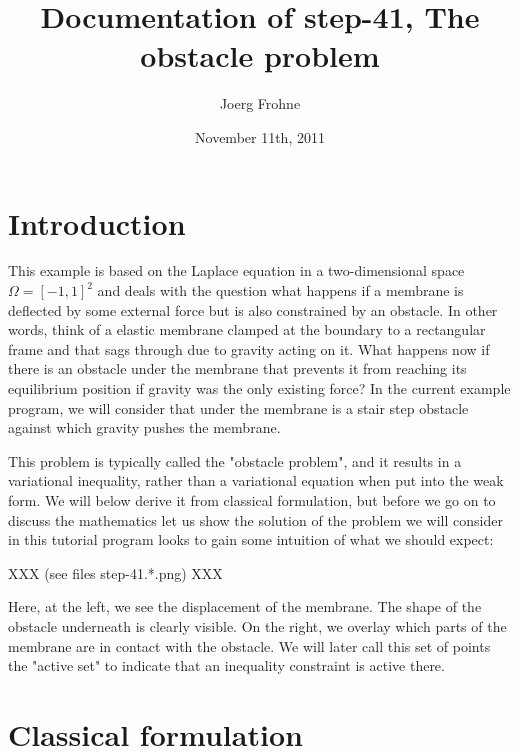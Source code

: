 \documentclass{article}
\title{Documentation of step-41, The obstacle problem}
\author{Joerg Frohne}
\date{November 11th, 2011}
\begin{document}
\maketitle

\section{Introduction}

This example is based on the Laplace equation in a two-dimensional space
$\Omega = \left[-1,1\right]^2$ and deals with the question what happens if a
membrane is deflected by some external force but is also constrained by an
obstacle. In other words, think of a elastic membrane clamped at the boundary
to a rectangular frame and that sags through due to gravity acting on it. What
happens now if there is an obstacle under the membrane that prevents it from
reaching its equilibrium position if gravity was the only existing force? In
the current example program, we will consider that under the membrane is a
stair step obstacle against which gravity pushes the membrane.

This problem is typically called the "obstacle problem", and it results in a
variational inequality, rather than a variational equation when put into the
weak form. We will below derive it from classical formulation, but before we
go on to discuss the mathematics let us show the solution of the problem we
will consider in this tutorial program looks to gain some intuition of what
we should expect:

XXX (see files step-41.*.png) XXX

Here, at the left, we see the displacement of the membrane. The shape of the
obstacle underneath is clearly visible. On the right, we overlay which parts
of the membrane are in contact with the obstacle. We will later call this set
of points the "active set" to indicate that an inequality constraint is active
there.


\section{Classical formulation}
\end{document}
